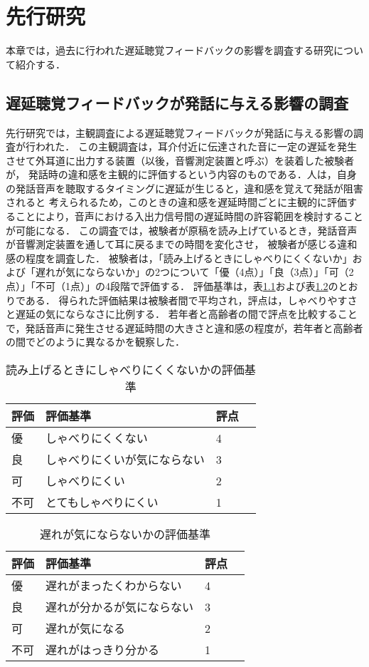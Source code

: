 \chapter{先行研究}
本章では，過去に行われた遅延聴覚フィードバックの影響を調査する研究について紹介する．
\section{遅延聴覚フィードバックが発話に与える影響の調査}
先行研究\cite{kayama}では，主観調査による遅延聴覚フィードバックが発話に与える影響の調査が行われた．
この主観調査は，耳介付近に伝達された音に一定の遅延を発生させて外耳道に出力する装置（以後，音響測定装置と呼ぶ）を装着した被験者が，
発話時の違和感を主観的に評価するという内容のものである．人は，自身の発話音声を聴取するタイミングに遅延が生じると，違和感を覚えて発話が阻害されると
考えられるため，このときの違和感を遅延時間ごとに主観的に評価することにより，音声における入出力信号間の遅延時間の許容範囲を検討することが可能になる．
この調査では，被験者が原稿を読み上げているとき，発話音声が音響測定装置を通して耳に戻るまでの時間を変化させ，
被験者が感じる違和感の程度を調査した．
被験者は，「読み上げるときにしゃべりにくくないか」および「遅れが気にならないか」の2つについて「優（4点）」「良（3点）」「可（2点）」「不可（1点）」の4段階で評価する．
評価基準は，表\ref{table:evaluation-1}および表\ref{table:evaluation-2}のとおりである．
得られた評価結果は被験者間で平均され，評点は，しゃべりやすさと遅延の気にならなさに比例する．
若年者と高齢者の間で評点を比較することで，発話音声に発生させる遅延時間の大きさと違和感の程度が，若年者と高齢者の間でどのように異なるかを観察した．
\begin{table}[tbp]
  \caption{読み上げるときにしゃべりにくくないかの評価基準}
  \label{table:evaluation-1}
  \centering
  \begin{tabular}{lllc}
    \hline
    評価 & 評価基準 & 評点\\
    \hline \hline
    優  & しゃべりにくくない & 4\\
    良  & しゃべりにくいが気にならない & 3\\
    可  & しゃべりにくい & 2\\
    不可  & とてもしゃべりにくい & 1\\
    \hline
  \end{tabular}
\end{table}
\begin{table}[tbp]
  \caption{遅れが気にならないかの評価基準}
  \label{table:evaluation-2}
  \centering
  \begin{tabular}{lllc}
    \hline
    評価 & 評価基準 & 評点\\
    \hline \hline
    優  & 遅れがまったくわからない & 4\\
    良  & 遅れが分かるが気にならない & 3\\
    可  & 遅れが気になる & 2\\
    不可  & 遅れがはっきり分かる & 1\\
    \hline
  \end{tabular}
\end{table}
